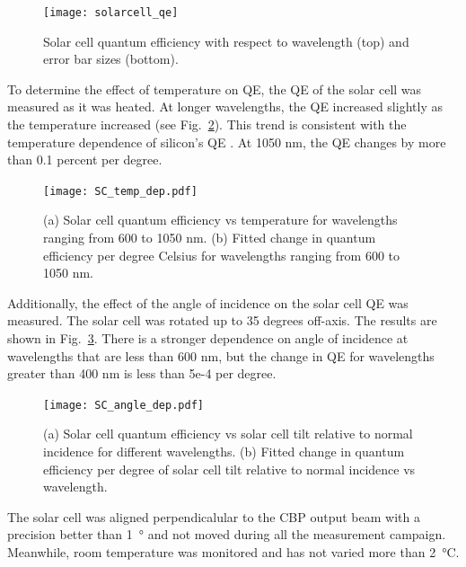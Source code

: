 \begin{figure}[!h]
\centering
\texttt{[image: solarcell\_qe]}
\caption{Solar cell quantum efficiency with respect to wavelength (top) and error bar sizes (bottom).}
\label{fig:qe}
\end{figure}

To determine the effect of temperature on QE, the QE of the solar cell was measured as it was heated. At longer wavelengths, the QE increased slightly as the temperature increased (see Fig.~\ref{fig:SC_temp}). This trend is consistent with the temperature dependence of silicon's QE \citep{Green_2008}. At 1050 nm, the QE changes by more than 0.1 percent per degree.
\begin{figure}[!h]
\centering
\texttt{[image: SC\_temp\_dep.pdf]}
\caption{(a) Solar cell quantum efficiency vs temperature for wavelengths ranging from 600 to 1050 nm. (b) Fitted change in quantum efficiency per degree Celsius for wavelengths ranging from 600 to 1050 nm.}
\label{fig:SC_temp}
\end{figure}

Additionally, the effect of the angle of incidence on the solar cell QE was measured. The solar cell was rotated up to 35 degrees off-axis. The results are shown in Fig.~\ref{fig:SC_angle}. There is a stronger dependence on angle of incidence at wavelengths that are less than 600 nm, but the change in QE for wavelengths greater than 400 nm is less than 5e-4 per degree.
\begin{figure}[!h]
\centering
\texttt{[image: SC\_angle\_dep.pdf]}
\caption{(a) Solar cell quantum efficiency vs solar cell tilt relative to normal incidence for different wavelengths. (b) Fitted change in quantum efficiency per degree of solar cell tilt relative to normal incidence vs wavelength.}
\label{fig:SC_angle}
\end{figure}

The solar cell was aligned perpendicalular to the CBP output beam with a precision better than \SI{1}{\degree} and not moved during all the measurement campaign. Meanwhile, room temperature was monitored and has not varied more than \SI{2}{\degreeCelsius}.

%

